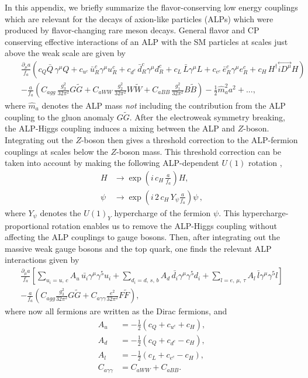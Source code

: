 \documentclass[preprint,prd,aps,tighten,nofootinbib,amssymb]{revtex4}
\newcommand{\bea}{\begin{eqnarray}}
\newcommand{\eea}{\end{eqnarray}}
\newcommand{\dis}[1]{\begin{equation}\begin{split}#1\end{split}\end{equation}}
\def\vpq{f_{a}}
\begin{document}
In this appendix, we briefly summarize the flavor-conserving low energy couplings  which are relevant for the decays of axion-like particles (ALPs) which were produced by flavor-changing rare meson decays. General flavor and CP conserving effective interactions of an ALP with the SM particles at scales
just above the weak scale are given by
\bea \label{EFT_SM_UV}
&& \frac{\partial_\mu a}{\vpq}\left( c_Q \bar{Q}\,\gamma^\mu Q + c_{u^c}\, \bar{u}_R^c\gamma^\mu u_R^c + c_{d^c}\, \bar{d}_R^c\gamma^\mu d_R^c + c_L\, \bar{L}\gamma^\mu L + c_{e^c}\, \bar{e}^c_R\gamma^\mu e_R^c  + c_{H}\, H^\dagger \overset{\leftrightarrow}{i D^\mu} H\right)\nonumber \\
&&-\frac{a}{\vpq}\left( C_{agg}\,\frac{g_3^2}{32\pi^2}G\widetilde{G} + C_{aWW}\,\frac{g_2^2}{32\pi^2}W\widetilde{W} + C_{aBB}\,\frac{g_1^2}{32\pi^2}B\widetilde{B}\right) -\frac{1}{2}\hat{m}_a^2 a^2 + ...,
\eea
where $\hat{m}_a$ denotes the ALP mass {\it not} including the contribution from the ALP coupling to the gluon anomaly $G\tilde G$.
 After the electroweak symmetry breaking, the ALP-Higgs coupling induces a mixing between the ALP and $Z$-boson. Integrating out the $Z$-boson then gives a threshold correction to the ALP-fermion couplings at scales below the $Z$-boson mass.  This threshold correction can be taken into account by making the following ALP-dependent $U(1)$ rotation \cite{Georgi:1986df},
\dis{
H & \rightarrow  \exp \left(i\,c_H\,\frac{a}{\vpq}\right) H, \\
\psi & \rightarrow  \exp \left(i  \,2\,c_H\, Y_\psi \frac{a}{\vpq}\right) \psi \, ,
}
where
$Y_\psi$ denotes  the $U(1)_Y$ hypercharge of the fermion $\psi$. This hypercharge-proportional rotation enables us to
remove the ALP-Higgs coupling without affecting the ALP couplings to gauge bosons.
Then, after integrating out the massive weak gauge bosons and the top quark,  
one finds the relevant ALP interactions given by
\dis{
\frac{\partial_\mu a}{\vpq}\left[  \sum_{u_i = u, \,c} A_u \,\bar{u_i}\gamma^\mu\gamma^5 u_i + \sum_{d_i = d, \,s,\, b}  A_d \,\bar{d_i}\gamma^\mu \gamma^5 d_i  + \sum_{l = e, \,\mu, \,\tau} A_l\,\bar{l}\gamma^\mu  \gamma^5 l\right] \\ - \frac{a}{\vpq}\left( C_{agg}\frac{g_3^2}{32\pi^2}G\widetilde{G} + C_{a\gamma\gamma}\frac{e^2}{32\pi^2}F\widetilde{F}\right),
}
where now all fermions are written as the Dirac fermions, and
\dis{ 
A_u &= -\frac{1}{2}(c_Q + c_{u^c} + c_H), \\
A_d &= -\frac{1}{2}(c_Q + c_{d^c} - c_H), \\
A_l &= -\frac{1}{2}(c_L + c_{e^c} - c_H),\\
C_{a \gamma \gamma}& = C_{a WW} + C_{a BB}.
}
\end{document}
